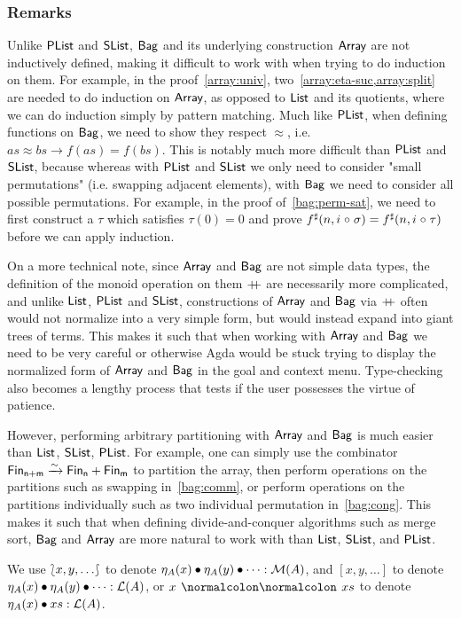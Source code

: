 \subsubsection*{Remarks}\label{bag:rep}

Unlike $\operatorname{\mathsf{PList}}$ and $\operatorname{\mathsf{SList}}$, $\operatorname{\mathsf{Bag}}$ and its underlying construction $\operatorname{\mathsf{Array}}$ are not inductively defined,
making it difficult to work with when trying to do induction on them. For example,
in the proof~\cref{array:univ}, two~\cref{array:eta-suc,array:split} are needed to do
induction on $\operatorname{\mathsf{Array}}$, as opposed to $\operatorname{\mathsf{List}}$ and its quotients, where we can do induction simply by
pattern matching. Much like $\operatorname{\mathsf{PList}}$, when defining functions on $\operatorname{\mathsf{Bag}}$, we need to show they respect
$\approx$, i.e. $as \approx bs \to f(as) = f(bs)$. This is notably much more difficult than
$\operatorname{\mathsf{PList}}$ and $\operatorname{\mathsf{SList}}$, because whereas with $\operatorname{\mathsf{PList}}$ and $\operatorname{\mathsf{SList}}$ we only need to consider "small permutations"
(i.e. swapping adjacent elements), with $\operatorname{\mathsf{Bag}}$ we need to consider all possible permutations. For example,
in the proof of~\cref{bag:perm-sat}, we need to first construct a $\tau$ which satisfies $\tau(0) = 0$ and prove
${f}^{\sharp}(n, i \mathrel{\circ} \sigma) = {f}^{\sharp}(n, i \mathrel{\circ} \tau)$ before we can apply induction.

\begin{toappendix}
    On a more technical note, since $\operatorname{\mathsf{Array}}$ and $\operatorname{\mathsf{Bag}}$ are not simple data types, the definition of
    the monoid operation on them $\mathbin{+\kern -0.4em+}$ are necessarily more complicated, and unlike $\operatorname{\mathsf{List}}$, $\operatorname{\mathsf{PList}}$
    and $\operatorname{\mathsf{SList}}$, constructions of $\operatorname{\mathsf{Array}}$ and $\operatorname{\mathsf{Bag}}$ via $\mathbin{+\kern -0.4em+}$ often would not normalize into a
    very simple form, but would instead expand into giant trees of terms. This makes it such that when working
    with $\operatorname{\mathsf{Array}}$ and $\operatorname{\mathsf{Bag}}$ we need to be very careful or otherwise Agda would be stuck trying to display
    the normalized form of $\operatorname{\mathsf{Array}}$ and $\operatorname{\mathsf{Bag}}$ in the goal and context menu. Type-checking also becomes a lengthy
    process that tests if the user possesses the virtue of patience.

    However, performing arbitrary partitioning with $\operatorname{\mathsf{Array}}$ and $\operatorname{\mathsf{Bag}}$ is much easier than
    $\operatorname{\mathsf{List}}$, $\operatorname{\mathsf{SList}}$, $\operatorname{\mathsf{PList}}$. For example,
    one can simply use the combinator ${\Fin[n+m] \xto{\sim} \Fin[n] + \Fin[m]}$ to partition the array,
    then perform operations on the partitions such as swapping in~\cref{bag:comm},
    or perform operations on the partitions individually such as two individual permutation in~\cref{bag:cong}.
    This makes it such that when defining divide-and-conquer algorithms such as merge sort,
    $\operatorname{\mathsf{Bag}}$ and $\operatorname{\mathsf{Array}}$ are more natural to work with than $\operatorname{\mathsf{List}}$, $\operatorname{\mathsf{SList}}$, and $\operatorname{\mathsf{PList}}$.

    We use ${\lbag}{x,y,\dots}{\rbag}$ to denote $\eta_A(x) \mathbin{\bullet} \eta_A(y) \mathbin{\bullet} \dots : \mathcal{M}(A)$,
    and $[x, y, \dots]$ to denote $\eta_A(x) \mathbin{\bullet} \eta_A(y) \mathbin{\bullet} \dots : \mathcal{L}(A)$,
    or $x \cons xs$ to denote $\eta_A(x) \mathbin{\bullet} xs : \mathcal{L}(A)$.
\end{toappendix}
